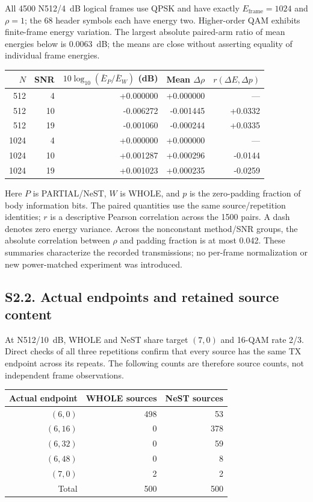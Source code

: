\documentclass[11pt,letterpaper]{article}
\begin{document}
All 4500 N512/4~dB logical frames use QPSK and have exactly $E_{\mathrm{frame}}=1024$ and $\rho=1$; the 68 header symbols each have energy two. Higher-order QAM exhibits finite-frame energy variation. The largest absolute paired-arm ratio of mean energies below is 0.0063~dB; the means are close without asserting equality of individual frame energies.
\clearpage
\begin{center}\small\setlength{\tabcolsep}{6pt}
\begin{tabular}{rrrrr}\toprule
$N$ & SNR & $10\log_{10}(\bar E_P/\bar E_W)$ (dB) & Mean $\Delta\rho$ & $r(\Delta E,\Delta p)$\\\midrule

512 & 4 & +0.000000 & +0.000000 & ---\\
512 & 10 & -0.006272 & -0.001445 & +0.0332\\
512 & 19 & -0.001060 & -0.000244 & +0.0335\\
1024 & 4 & +0.000000 & +0.000000 & ---\\
1024 & 10 & +0.001287 & +0.000296 & -0.0144\\
1024 & 19 & +0.001023 & +0.000235 & -0.0259\\
\bottomrule\end{tabular}\end{center}

Here $P$ is PARTIAL/NeST, $W$ is WHOLE, and $p$ is the zero-padding fraction of body information bits. The paired quantities use the same source/repetition identities; $r$ is a descriptive Pearson correlation across the 1500 pairs. A dash denotes zero energy variance. Across the nonconstant method/SNR groups, the absolute correlation between $\rho$ and padding fraction is at most 0.042. These summaries characterize the recorded transmissions; no per-frame normalization or new power-matched experiment was introduced.
\subsection*{S2.2. Actual endpoints and retained source content}
At N512/10~dB, WHOLE and NeST share target $(7,0)$ and 16-QAM rate 2/3. Direct checks of all three repetitions confirm that every source has the same TX endpoint across its repeats. The following counts are therefore source counts, not independent frame observations.
\begin{center}\begin{tabular}{rrr}\toprule
Actual endpoint & WHOLE sources & NeST sources\\\midrule

$(6,0)$ & 498 & 53\\
$(6,16)$ & 0 & 378\\
$(6,32)$ & 0 & 59\\
$(6,48)$ & 0 & 8\\
$(7,0)$ & 2 & 2\\
\midrule Total & 500 & 500\\\bottomrule\end{tabular}\end{center}
\end{document}
